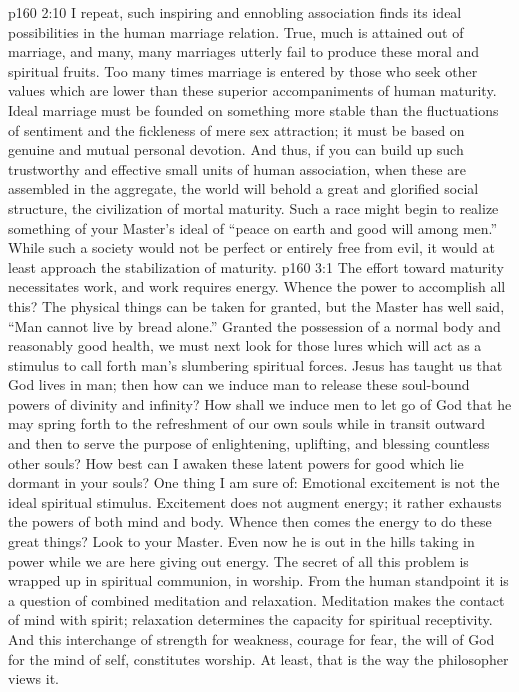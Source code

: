 \vs p160 2:10 \pc I repeat, such inspiring and ennobling association finds its ideal possibilities in the human marriage relation. True, much is attained out of marriage, and many, many marriages utterly fail to produce these moral and spiritual fruits. Too many times marriage is entered by those who seek other values which are lower than these superior accompaniments of human maturity. Ideal marriage must be founded on something more stable than the fluctuations of sentiment and the fickleness of mere sex attraction; it must be based on genuine and mutual personal devotion. And thus, if you can build up such trustworthy and effective small units of human association, when these are assembled in the aggregate, the world will behold a great and glorified social structure, the civilization of mortal maturity. Such a race might begin to realize something of your Master’s ideal of “peace on earth and good will among men.” While such a society would not be perfect or entirely free from evil, it would at least approach the stabilization of maturity.
\vs p160 3:1 The effort toward maturity necessitates work, and work requires energy. Whence the power to accomplish all this? The physical things can be taken for granted, but the Master has well said, \textcolor{ubdarkred}{“Man cannot live by bread alone.”} Granted the possession of a normal body and reasonably good health, we must next look for those lures which will act as a stimulus to call forth man’s slumbering spiritual forces. Jesus has taught us that God lives in man; then how can we induce man to release these soul\hyp{}bound powers of divinity and infinity? How shall we induce men to let go of God that he may spring forth to the refreshment of our own souls while in transit outward and then to serve the purpose of enlightening, uplifting, and blessing countless other souls? How best can I awaken these latent powers for good which lie dormant in your souls? One thing I am sure of: Emotional excitement is not the ideal spiritual stimulus. Excitement does not augment energy; it rather exhausts the powers of both mind and body. Whence then comes the energy to do these great things? Look to your Master. Even now he is out in the hills taking in power while we are here giving out energy. The secret of all this problem is wrapped up in spiritual communion, in worship. From the human standpoint it is a question of combined meditation and relaxation. Meditation makes the contact of mind with spirit; relaxation determines the capacity for spiritual receptivity. And this interchange of strength for weakness, courage for fear, the will of God for the mind of self, constitutes worship. At least, that is the way the philosopher views it.
